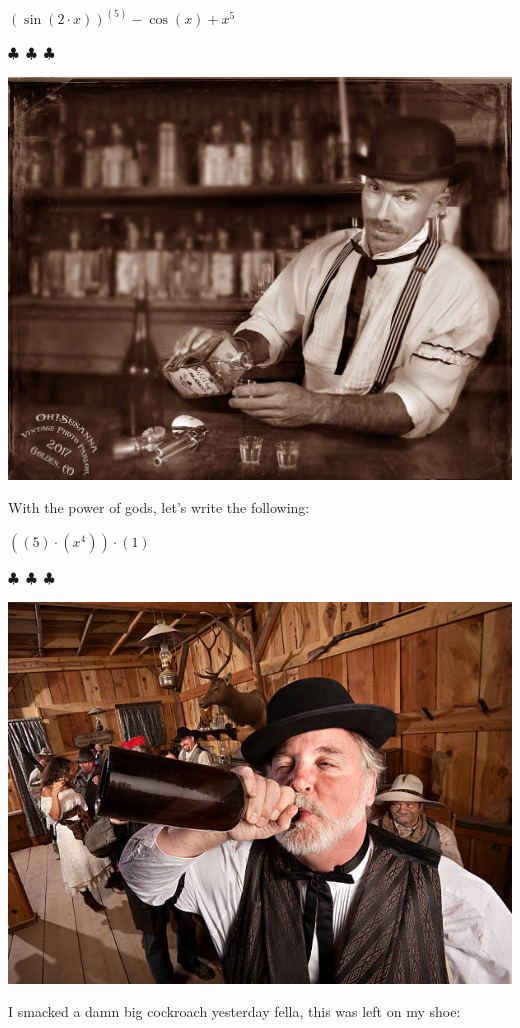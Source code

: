 \documentclass{article}
\begin{document}
\begin{center}$
{{{{({\sin{({{2}\cdot{x}})}})}^{({5})}}-{\cos{({x})}}}+{{x}^{5}}}
$\end{center}
\begin{center} $\clubsuit$~$\clubsuit$~$\clubsuit$ \end{center}\begin{center}  \includegraphics[scale=0.3]{funny_pics/bartender.jpg} \end{center} With the power of gods, let's write the following: 
\begin{center}$
{{({{({5})}\cdot{({{x}^{4}})}})}\cdot{({1})}}
$\end{center}
\begin{center} $\clubsuit$~$\clubsuit$~$\clubsuit$ \end{center}\begin{center}  \includegraphics[scale=1.4]{funny_pics/drunk_cowboy.jpg} \end{center} I smacked a damn big cockroach yesterday fella, this was left on my shoe: 
\end{document}
